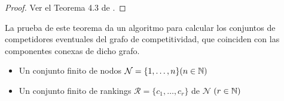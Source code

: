 \begin{proof}
Ver el Teorema 4.3 de \cite{journals/corr/CriadoGPR13a}.
\end{proof}

La prueba de este teorema da un algoritmo para calcular los conjuntos de competidores eventuales del grafo de competitividad, que coinciden con las componentes conexas de dicho grafo.

\begin{algorithm}\label{algoritmo}
 \Input{}
 \begin{itemize}
 	\item Un conjunto finito de nodos $\mathcal{N} = \{1,\dots, n\} (n \in \mathbb{N})$
 	\item Un conjunto finito de rankings $\mathcal{R} = \{c_1,\dots,c_r\}$ de $\mathcal{N}$ $(r \in \mathbb{N})$
 \end{itemize}
 
 
 
 \end{algorithm}

